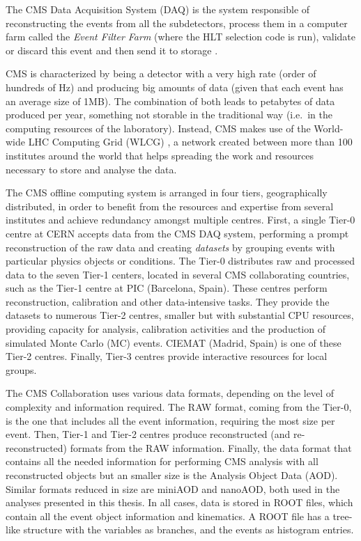 \documentclass[../main.tex]{subfiles}
\begin{document}
The CMS Data Acquisition System (DAQ) is the system responsible of reconstructing the events from all the subdetectors, process them in a computer farm called the \textit{Event Filter Farm} (where the HLT selection code is run), validate or discard this event and then send it to storage \cite{intro:exp:cms}.

CMS is characterized by being a detector with a very high rate (order of hundreds of Hz) and producing big amounts of data (given that each event has an average size of 1MB). The combination of both leads to petabytes of data produced per year, something not storable in the traditional way (i.e.~in the computing resources of the laboratory). Instead, CMS makes use of the World-wide LHC Computing Grid (WLCG) \cite{intro:exp:wlcg_1, intro:exp:wlcg_2}, a network created between more than 100 institutes around the world that helps spreading the work and resources necessary to store and analyse the data.

The CMS offline computing system \cite{intro:exp:cms_computing} is arranged in four tiers, geographically distributed, in order to benefit from the resources and expertise from several institutes and achieve redundancy amongst multiple centres. First, a single Tier-0 centre at CERN accepts data from the CMS DAQ system, performing a prompt reconstruction of the raw data and creating \textit{datasets} by grouping events with particular physics objects or conditions. The Tier-0 distributes raw and processed data to the seven Tier-1 centers, located in several CMS collaborating countries, such as the Tier-1 centre at PIC (Barcelona, Spain). These centres perform reconstruction, calibration and other data-intensive tasks. They provide the datasets to numerous Tier-2 centres, smaller but with substantial CPU resources, providing capacity for analysis, calibration activities and the production of simulated Monte Carlo (MC) events. CIEMAT (Madrid, Spain) is one of these Tier-2 centres. Finally, Tier-3 centres provide interactive resources for local groups.

The CMS Collaboration uses various data formats, depending on the level of complexity and information required. The RAW format, coming from the Tier-0, is the one that includes all the event information, requiring the most size per event. Then, Tier-1 and Tier-2 centres produce reconstructed (and re-reconstructed) formats from the RAW information. Finally, the data format that contains all the needed information for performing CMS analysis with all reconstructed objects but an smaller size is the Analysis Object Data (AOD). Similar formats reduced in size are miniAOD and nanoAOD, both used in the analyses presented in this thesis. In all cases, data is stored in ROOT \cite{intro:exp:root} files, which contain all the event object information and kinematics. A ROOT file has a tree-like structure with the variables as branches, and the events as histogram entries.
\end{document}
